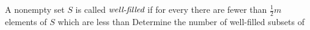 A nonempty set $S$ is called $\emph{well-filled}$ if for every  there are fewer than $\frac 12 m$ elements of $S$ which are less than 
Determine the number of well-filled subsets of 
